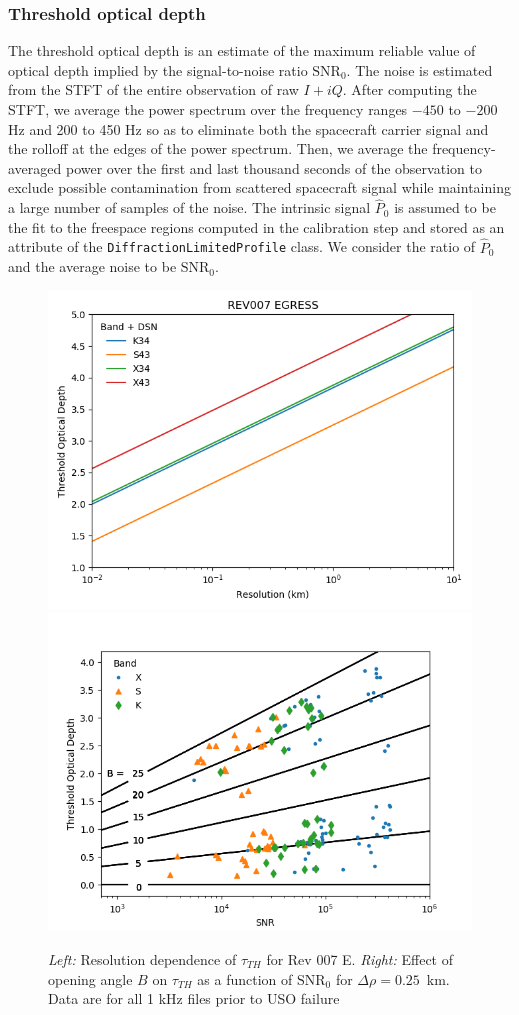 \documentclass[titlepage, 12pt]{article}
\begin{document}
            \subsubsection{Threshold optical depth}\label{sec:tauthresh}
                The threshold optical depth is an estimate of the maximum reliable
                value of optical depth implied by the signal-to-noise ratio
                $\textrm{SNR}_0$. The noise is estimated from the STFT of
                the entire observation of raw $I+iQ$. After computing the
                STFT, we average the power spectrum over the frequency
                ranges $-450$ to $-200$ Hz and 200 to 450 Hz so as to
                eliminate both the spacecraft carrier signal and the rolloff
                at the edges of the power
                spectrum. Then, we average the frequency-averaged power over the
                first and last thousand seconds of the observation to exclude
                possible contamination from scattered spacecraft signal while
                maintaining a large number of samples of the noise. The intrinsic
                signal $\hat{P}_0$ is assumed to be the fit to the freespace
                regions computed in the calibration step and stored as an attribute
                of the \texttt{DiffractionLimitedProfile} class. We consider the
                ratio of $\hat{P}_0$ and the average noise to be
                $\textrm{SNR}_0$.
                \par\hfill\par
                \begin{figure}
                    \centering
                    \includegraphics[width=0.48\linewidth]{figs/tauthresh_res_rev007e.png} 
                    \includegraphics[width=0.505\linewidth]{figs/tauthresh_snr.png}
                    \caption{\textit{Left:} Resolution dependence of $\tau_{TH}$
                            for Rev 007 E. \textit{Right:} Effect of opening angle $B$
                            on $\tau_{TH}$ as a function of $\textrm{SNR}_0$ for
                            $\Delta\rho=0.25$~km. Data are for all 1 kHz files prior to 
                            USO failure}
                    \label{fig:tauthresh}
                \end{figure}
\end{document}
